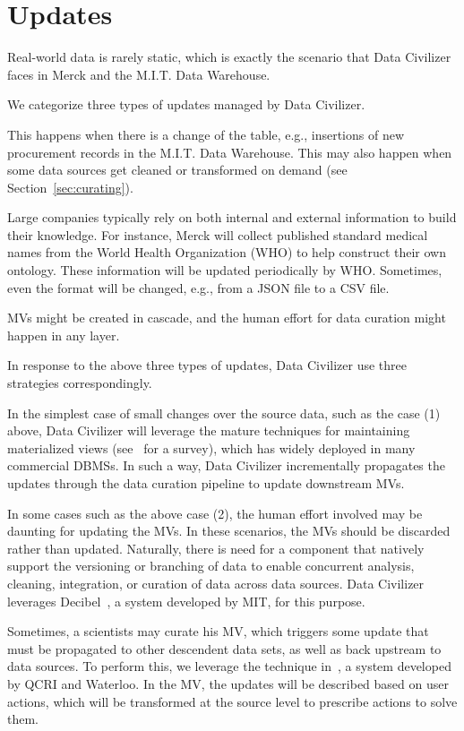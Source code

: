 \section{Updates}
\label{sec:updates}

Real-world data is rarely static, which is exactly the scenario that Data Civilizer faces in Merck and the M.I.T. Data Warehouse.

We categorize three types of updates managed by Data Civilizer.

This happens when there is a change of the table, e.g., insertions of new procurement records in the M.I.T. Data Warehouse. This may also happen when some data sources get cleaned or transformed on demand (see Section~\ref{sec:curating}).

Large companies typically rely on both internal and external information to build their knowledge. For instance, Merck will collect published standard medical names from the World Health Organization (WHO) to help construct their own ontology. These information will be updated periodically by WHO. Sometimes, even the format will be changed, e.g., from a JSON file to a CSV file.

MVs might be created in cascade, and the human effort for data curation might happen in any layer. 

In response to the above three types of updates, Data Civilizer use three strategies correspondingly.

In the simplest case of small changes over the source data, such as the case (1) above, Data Civilizer will leverage the mature techniques for maintaining materialized views (see~\cite{DBLP:journals/debu/GuptaM95} for a survey), which has widely deployed in many commercial DBMSs. In such a way, Data Civilizer incrementally propagates the updates through the data curation pipeline to update downstream MVs.  

In some cases such as the above case (2), the human effort involved may be daunting for updating the MVs. In these scenarios, the MVs should be discarded rather than updated. Naturally, there is need for a component that natively support the versioning or branching of data to enable concurrent analysis, cleaning, integration, or curation of data across data sources. 
%
Data Civilizer leverages Decibel~\cite{DBLP:journals/pvldb/MaddoxGEMPD16}, a system developed by MIT, for this purpose.

Sometimes, a scientists may curate his MV, which triggers some update that must be propagated to other descendent data sets, as well as back upstream to data sources. To perform this, we leverage the technique in~\cite{DBLP:conf/sigmod/ChalamallaIOP14}, a system developed by QCRI and Waterloo. In the MV, the updates will be described based on user actions, which will be transformed at the source level to prescribe actions to solve them. 
